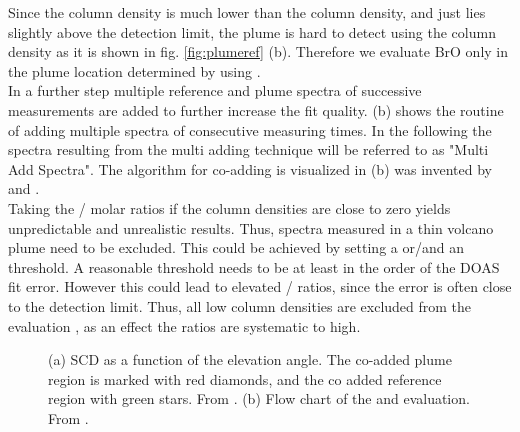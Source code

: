 Since the  column density is much lower than the  column density, and just lies slightly above the detection limit, the plume is hard to detect using the  column density as it is shown in fig. \ref{fig:plumeref} (b). 
Therefore we evaluate BrO only in the plume location determined by using .\\
In a further step multiple reference and plume spectra of successive measurements are added to further increase the fit quality.
 (b) shows the routine of adding multiple spectra of consecutive measuring times. In the following the spectra resulting from the multi adding technique will be referred to as "Multi Add Spectra". The algorithm for co-adding is visualized in  (b) was invented by \citet{vogel2011volcanic} and \citet{lubcke2014bro}.\\
%
Taking the / molar ratios if the column densities are close to zero yields unpredictable and unrealistic results. Thus, spectra measured in a thin volcano plume need to be excluded.
This could be achieved by setting a  or/and an  threshold. A reasonable  threshold needs to be at least in the order of the DOAS fit error. However this could lead to elevated / ratios, since the  error is often close to the detection limit. Thus, all low  column densities are excluded from the evaluation  \citep{lubcke2014bro}, as an effect the ratios are systematic to high.
%
\begin{figure}
	\caption{(a)  SCD as a function of the elevation angle. The co-added plume region is marked with red diamonds, and the co added reference region with green stars. From \cite{WarnachSimon}. (b) Flow chart of the   and  evaluation. From \cite{lubcke2014optical}.}
	\label{fig:algorithm}
\end{figure}
